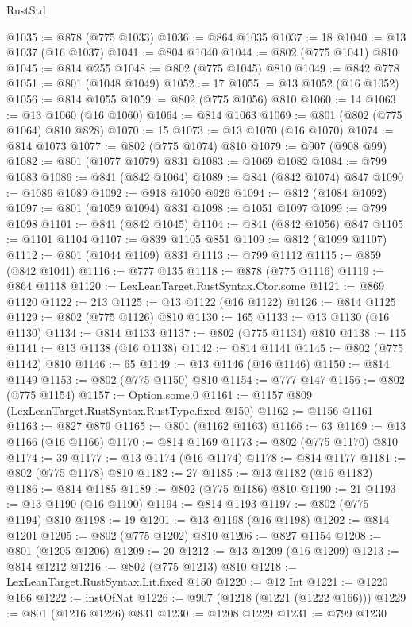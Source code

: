 \begin{lexlean}{RustStd}
\begin{coremodule}
{\begin{coremodule}
{{{{{@1035 := @878 (@775 @1033)
@1036 := @864 @1035
@1037 := 18
@1040 := @13 @1037 (@16 @1037)
@1041 := @804 @1040
@1044 := @802 (@775 @1041) @810
@1045 := @814 @255
@1048 := @802 (@775 @1045) @810
@1049 := @842 @778
@1051 := @801 (@1048 @1049)
@1052 := 17
@1055 := @13 @1052 (@16 @1052)
@1056 := @814 @1055
@1059 := @802 (@775 @1056) @810
@1060 := 14
@1063 := @13 @1060 (@16 @1060)
@1064 := @814 @1063
@1069 := @801 (@802 (@775 @1064) @810 @828)
@1070 := 15
@1073 := @13 @1070 (@16 @1070)
@1074 := @814 @1073
@1077 := @802 (@775 @1074) @810
@1079 := @907 (@908 @99)
@1082 := @801 (@1077 @1079) @831
@1083 := @1069 @1082
@1084 := @799 @1083
@1086 := @841 (@842 @1064)
@1089 := @841 (@842 @1074) @847
@1090 := @1086 @1089
@1092 := @918 @1090 @926
@1094 := @812 (@1084 @1092)
@1097 := @801 (@1059 @1094) @831
@1098 := @1051 @1097
@1099 := @799 @1098
@1101 := @841 (@842 @1045)
@1104 := @841 (@842 @1056) @847
@1105 := @1101 @1104
@1107 := @839 @1105 @851
@1109 := @812 (@1099 @1107)
@1112 := @801 (@1044 @1109) @831
@1113 := @799 @1112
@1115 := @859 (@842 @1041)
@1116 := @777 @135
@1118 := @878 (@775 @1116)
@1119 := @864 @1118
@1120 := LexLeanTarget.RustSyntax.Ctor.some
@1121 := @869 @1120
@1122 := 213
@1125 := @13 @1122 (@16 @1122)
@1126 := @814 @1125
@1129 := @802 (@775 @1126) @810
@1130 := 165
@1133 := @13 @1130 (@16 @1130)
@1134 := @814 @1133
@1137 := @802 (@775 @1134) @810
@1138 := 115
@1141 := @13 @1138 (@16 @1138)
@1142 := @814 @1141
@1145 := @802 (@775 @1142) @810
@1146 := 65
@1149 := @13 @1146 (@16 @1146)
@1150 := @814 @1149
@1153 := @802 (@775 @1150) @810
@1154 := @777 @147
@1156 := @802 (@775 @1154)
@1157 := Option.some.{0}
@1161 := @1157 @809 (LexLeanTarget.RustSyntax.RustType.fixed @150)
@1162 := @1156 @1161
@1163 := @827 @879
@1165 := @801 (@1162 @1163)
@1166 := 63
@1169 := @13 @1166 (@16 @1166)
@1170 := @814 @1169
@1173 := @802 (@775 @1170) @810
@1174 := 39
@1177 := @13 @1174 (@16 @1174)
@1178 := @814 @1177
@1181 := @802 (@775 @1178) @810
@1182 := 27
@1185 := @13 @1182 (@16 @1182)
@1186 := @814 @1185
@1189 := @802 (@775 @1186) @810
@1190 := 21
@1193 := @13 @1190 (@16 @1190)
@1194 := @814 @1193
@1197 := @802 (@775 @1194) @810
@1198 := 19
@1201 := @13 @1198 (@16 @1198)
@1202 := @814 @1201
@1205 := @802 (@775 @1202) @810
@1206 := @827 @1154
@1208 := @801 (@1205 @1206)
@1209 := 20
@1212 := @13 @1209 (@16 @1209)
@1213 := @814 @1212
@1216 := @802 (@775 @1213) @810
@1218 := LexLeanTarget.RustSyntax.Lit.fixed @150
@1220 := @12 Int
@1221 := @1220 @166
@1222 := instOfNat
@1226 := @907 (@1218 (@1221 (@1222 @166)))
@1229 := @801 (@1216 @1226) @831
@1230 := @1208 @1229
@1231 := @799 @1230
}}}}}
\end{coremodule}}
\end{coremodule}
\end{lexlean}
